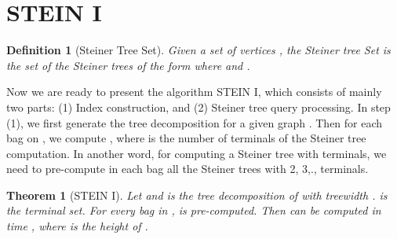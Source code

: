\documentclass[preprint,12pt]{elsarticle}
\newtheorem{theorem}{Theorem}
\newtheorem{definition}{Definition}
\newtheorem{example}{Example}
\newcommand{\nop}[1]{}
\begin{document}
\section{STEIN I}


\nop{
\begin{example}
Consider the nice tree decomposition in Figure \ref{fig:nicedecomposition}.
The root of the induced subtree of vertices  and 
is  and  respectively.
Then according to Theorem \ref{the:vsintd}, every one from the bags along the path
between  and , namely , , ,
, , ,  and , is a -vertex separator.
\end{example}
}


\begin{definition}[Steiner Tree Set]
Given a set of vertices ,
the Steiner tree Set  is the set of the Steiner trees
of the form  where   
and .
\end{definition}


Now we  are ready to present the algorithm STEIN I,
which consists of mainly two parts:
(1) Index construction, and  (2) Steiner tree query processing.
In step (1), we first generate the tree decomposition  for a given graph .
Then for each bag  on ,
we compute   , where  is the number 
of terminals of the Steiner tree computation.
In another word, for computing a Steiner tree with  terminals, 
we need to pre-compute in each bag all the Steiner trees with 2, 3,.,  terminals.


\begin{theorem}[STEIN I]
\label{the:stein1}
Let  and  is the tree decomposition of  with treewidth .
 is the terminal set. For every bag  in ,
 is pre-computed. Then  can be computed
in time , where  is the height of .
\end{theorem}
\end{document}
